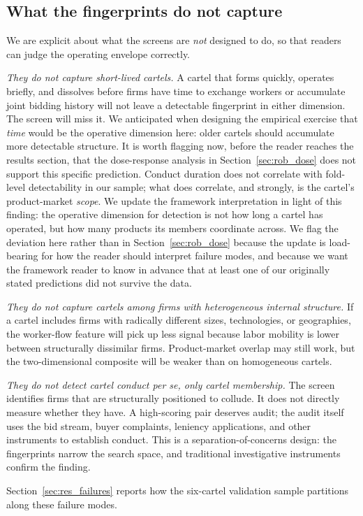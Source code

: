 \subsection{What the fingerprints do not capture}

We are explicit about what the screens are \emph{not} designed to do, so that readers can judge the operating envelope correctly.

\emph{They do not capture short-lived cartels.} A cartel that forms quickly, operates briefly, and dissolves before firms have time to exchange workers or accumulate joint bidding history will not leave a detectable fingerprint in either dimension. The screen will miss it. We anticipated when designing the empirical exercise that \emph{time} would be the operative dimension here: older cartels should accumulate more detectable structure. It is worth flagging now, before the reader reaches the results section, that the dose-response analysis in Section~\ref{sec:rob_dose} does not support this specific prediction. Conduct duration does not correlate with fold-level detectability in our sample; what does correlate, and strongly, is the cartel's product-market \emph{scope}. We update the framework interpretation in light of this finding: the operative dimension for detection is not how long a cartel has operated, but how many products its members coordinate across. We flag the deviation here rather than in Section~\ref{sec:rob_dose} because the update is load-bearing for how the reader should interpret failure modes, and because we want the framework reader to know in advance that at least one of our originally stated predictions did not survive the data.

\emph{They do not capture cartels among firms with heterogeneous internal structure.} If a cartel includes firms with radically different sizes, technologies, or geographies, the worker-flow feature will pick up less signal because labor mobility is lower between structurally dissimilar firms. Product-market overlap may still work, but the two-dimensional composite will be weaker than on homogeneous cartels.

\emph{They do not detect cartel conduct per se, only cartel membership.} The screen identifies firms that are structurally positioned to collude. It does not directly measure whether they have. A high-scoring pair deserves audit; the audit itself uses the bid stream, buyer complaints, leniency applications, and other instruments to establish conduct. This is a separation-of-concerns design: the fingerprints narrow the search space, and traditional investigative instruments confirm the finding.

Section~\ref{sec:res_failures} reports how the six-cartel validation sample partitions along these failure modes.
